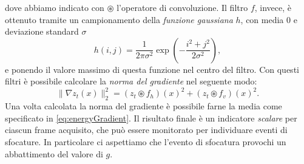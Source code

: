 dove abbiamo indicato con $\circledast$ l'operatore di convoluzione.
Il filtro $f$, invece, \`e ottenuto tramite un campionamento della \textit{funzione gaussiana} $h$, con media $0$ e deviazione standard $\sigma$
\begin{equation}
\label{eq:gaussian}
h(i,j)=\frac{1}{2\pi\sigma^2}\exp\left(-\frac{i^2+j^2}{2\sigma^2}\right),
\end{equation}
e ponendo il valore massimo di questa funzione nel centro del filtro.
Con questi filtri \`e possibile calcolare la \textit{norma del gradiente} nel seguente modo:
\begin{equation}
\label{eq:normaGradiente}
\| \nabla z_t(x) \|_2^2=\left(z_t \circledast f_h\right)(x)^2 + \left(z_t \circledast f_v\right)(x)^2.
\end{equation}
Una volta calcolata la norma del gradiente \`e possibile farne la media come specificato in \eqref{eq:energyGradient}.
Il risultato finale \`e un indicatore \textit{scalare} per ciascun frame acquisito, che pu\`o essere monitorato per individuare eventi di sfocature. 
In particolare ci aspettiamo che l'evento di sfocatura provochi un abbattimento del valore di $g$.
